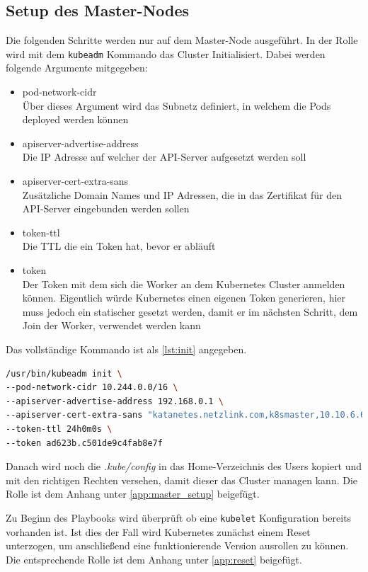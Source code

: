 \subsection{Setup des Master-Nodes}
Die folgenden Schritte werden nur auf dem Master-Node ausgeführt. 
In der Rolle wird mit dem \texttt{kubeadm} Kommando das Cluster Initialisiert.
Dabei werden folgende Argumente mitgegeben:
\begin{itemize}
    \item pod-network-cidr \\ Über dieses Argument wird das Subnetz definiert, in welchem die Pods deployed werden können
    \item apiserver-advertise-address \\ Die \ac{IP} Adresse auf welcher der \ac{API}-Server aufgesetzt werden soll
    \item apiserver-cert-extra-sans \\ Zusätzliche Domain Names und \ac{IP} Adressen, die in das Zertifikat für den \ac{API}-Server eingebunden werden sollen
    \item token-ttl \\ Die \ac{TTL} die ein Token hat, bevor er abläuft
    \item token \\ Der Token mit dem sich die Worker an dem Kubernetes Cluster anmelden können. Eigentlich würde Kubernetes einen eigenen Token generieren, hier muss jedoch ein statischer gesetzt werden, damit er im nächsten Schritt, dem Join der Worker, verwendet werden kann
\end{itemize}
Das vollständige Kommando ist als \ref{lst:init} angegeben.
\begin{lstlisting}[language=bash, caption={kubeadm init}, label=lst:init]
/usr/bin/kubeadm init \
--pod-network-cidr 10.244.0.0/16 \
--apiserver-advertise-address 192.168.0.1 \
--apiserver-cert-extra-sans "katanetes.netzlink.com,k8smaster,10.10.6.60,192.168.0.1,api.katernetes.local" \
--token-ttl 24h0m0s \
--token ad623b.c501de9c4fab8e7f
\end{lstlisting}

Danach wird noch die \textit{.kube/config} in das Home-Verzeichnis des Users kopiert und mit den richtigen Rechten versehen, damit dieser das Cluster managen kann.
Die Rolle ist dem Anhang unter \ref{app:master_setup} beigefügt.

Zu Beginn des Playbooks wird überprüft ob eine \texttt{kubelet} Konfiguration bereits vorhanden ist. 
Ist dies der Fall wird Kubernetes zunächst einem Reset unterzogen, um anschließend eine funktionierende Version ausrollen zu können.
Die entsprechende Rolle ist dem Anhang unter \ref{app:reset} beigefügt.


